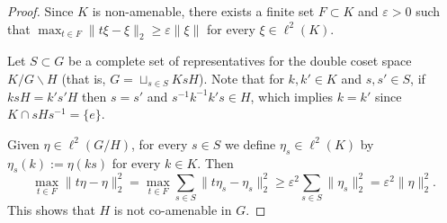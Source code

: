 \documentclass[10pt,a4paper]{amsart}
\newcommand{\eps}{\varepsilon}
\begin{document}
\begin{proof}
Since $K$ is non-amenable, there exists a finite set $F\subset K$ and $\eps>0$ such that $\max_{t\in F} \|t\xi - \xi\|_2 \ge \eps\|\xi\|$ for every $\xi\in\ell^2(K)$. 

Let $S\subset G$ be a complete set of representatives for the double coset space $K/G\backslash H$ (that is, $G = \sqcup_{s\in S} KsH$). Note that for $k, k'\in K$ and $s, s'\in S$, if $ksH = k's'H$ then $s=s'$ and $s^{-1}k^{-1}k's\in H$, which implies $k=k'$ since $K\cap sHs^{-1} = \{e\}$.

Given $\eta\in\ell^2(G/H)$, for every $s\in S$ we define $\eta_s\in\ell^2(K)$ by $\eta_s(k):= \eta(ks)$ for every $k\in K$. 
 Then
\[
\max_{t\in F} \|t\eta - \eta\|_2^2 = \max_{t\in F} \sum_{s\in S}\|t\eta_s - \eta_s\|_2^2 \ge \eps^2\sum_{s\in S}\|\eta_s\|_2^2 =\eps^2\|\eta\|_2^2 .
\]
This shows that $H$ is not co-amenable in $G$.
\end{proof}
\end{document}
